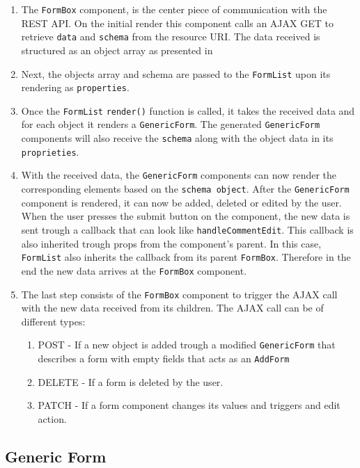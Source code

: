 \begin{enumerate}
	\item The \texttt{FormBox} component, is the center piece of communication with the REST API. On the initial render this component calls an AJAX GET to retrieve \texttt{data} and \texttt{schema} from the resource URI. The data received is structured as an object array as presented in 
	\item Next, the objects array and schema are passed to the \texttt{FormList} upon its rendering as \texttt{properties}.
	\item Once the \texttt{FormList} \texttt{render()} function is called, it takes the received data and for each object it renders a \texttt{GenericForm}. The generated \texttt{GenericForm} components will also receive the \texttt{schema} along with the object data in its \texttt{proprieties}.
	\item With the received data, the \texttt{GenericForm} components can now render the corresponding elements based on the \texttt{schema object}. After the \texttt{GenericForm} component is rendered, it can now be added, deleted or edited by the user. When the user presses the submit button on the component, the new data is sent trough a callback that can look like \texttt{handleCommentEdit}. This callback is also inherited trough props from the component's parent. In this case, \texttt{FormList} also inherits the callback from its parent \texttt{FormBox}. Therefore in the end the new data arrives at the \texttt{FormBox} component.
	\item The last step consists of the \texttt{FormBox} component to trigger the AJAX call with the new data received from its children. The AJAX call can be of different types:
	\begin{enumerate}
		\item POST - If a new object is added trough a modified \texttt{GenericForm} that describes a form with empty fields that acts as an \texttt{AddForm}
		\item DELETE - If a form is deleted by the user.
		\item PATCH - If a form component changes its values and triggers and edit action.\\
	\end{enumerate}
	
\end{enumerate}


\subsection{Generic Form}
\label{sub-sec:generic-form}

